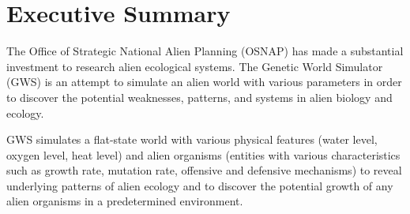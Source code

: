 \chapter*{Executive Summary}
The Office of Strategic National Alien Planning (OSNAP) has made a substantial investment to research alien ecological systems. The Genetic World Simulator (GWS) is an attempt to simulate an alien world with various parameters in order to discover the potential weaknesses, patterns, and systems in alien biology and ecology.

GWS simulates a flat-state world with various physical features (water level, oxygen level, heat level) and alien organisms (entities with various characteristics such as growth rate, mutation rate, offensive and defensive mechanisms) to reveal underlying patterns of alien ecology and to discover the potential growth of any alien organisms in a predetermined environment.